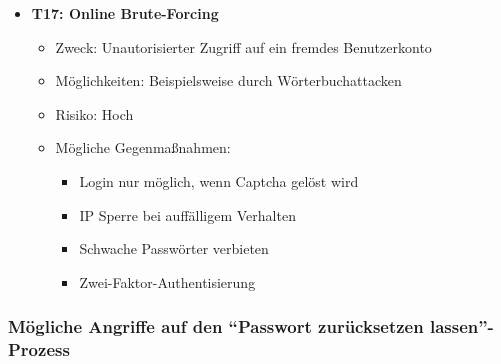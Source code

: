 \documentclass[12pt,DIV14,BCOR10mm,a4paper,parskip=half-,headsepline,headinclude,english,ngerman,bibliography=totocnumbered]{scrreprt}
\begin{document}
\begin{itemize}
  \hypertarget{threat17}{}
  \item \textbf{T17: Online Brute-Forcing}
  \begin{itemize}
  \item Zweck: Unautorisierter Zugriff auf ein fremdes Benutzerkonto
  \item Möglichkeiten: Beispielsweise durch Wörterbuchattacken
  \item Risiko: Hoch
  \item Mögliche Gegenmaßnahmen:
  \begin{itemize}
      \item Login nur möglich, wenn Captcha gelöst wird
      \item IP Sperre bei auffälligem Verhalten
      \item Schwache Passwörter verbieten
      \item Zwei-Faktor-Authentisierung
    \end{itemize}
  \end{itemize}
\end{itemize}

\subsubsection{Mögliche Angriffe auf den \enquote{Passwort zurücksetzen lassen}-Prozess}
\end{document}
